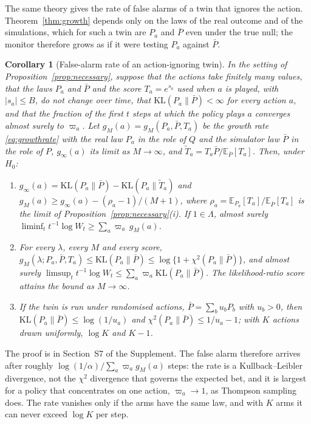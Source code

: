 \documentclass[12pt]{article}
\newcommand{\E}{\mathbb{E}}
\newcommand{\KL}{\mathrm{KL}}
\newtheorem{corollary}{Corollary}
\theoremstyle{remark}
\begin{document}
The same theory gives the rate of false alarms of a twin that ignores the
action. Theorem~\ref{thm:growth} depends only on the laws of the real outcome
and of the simulations, which for such a twin are $P_a$ and $\bar P$ even
under the true null; the monitor therefore grows as if it were testing $P_a$
against $\bar P$.

\begin{corollary}[False-alarm rate of an action-ignoring twin]\label{cor:falsealarm}
In the setting of Proposition~\ref{prop:necessary}, suppose that the actions
take finitely many values, that the laws $P_a$ and $\bar P$ and the score
$T_a = e^{s_a}$ used when $a$ is played, with $|s_a| \le B$, do not change
over time, that $\KL(P_a\|\bar P) < \infty$ for every action $a$, and that the
fraction of the first $t$ steps at which the policy plays $a$ converges almost
surely to $\varpi_a$. Let $g_M(a) = g_M(P_a, \bar P, T_a)$ be the growth rate
\eqref{eq:growthrate} with the real law $P_a$ in the role of $Q$ and the
simulator law $\bar P$ in the role of $P$, $g_\infty(a)$ its limit as
$M \to \infty$, and
$\tilde T_a = T_a\bar P/\E_{\bar P}[T_a]$. Then, under $H_0$:
\begin{enumerate}
\item[(i)] $g_\infty(a) = \KL(P_a\|\bar P) - \KL(P_a\|\tilde T_a)$ and
$g_M(a) \ge g_\infty(a) - (\rho_a - 1)/(M+1)$, where
$\rho_a = \E_{P_a}[T_a]/\E_{\bar P}[T_a]$ is the limit of
Proposition~\ref{prop:necessary}(i). If $1 \in \Lambda$, almost surely
$\liminf_t t^{-1}\log W_t \ge \sum_a \varpi_a\, g_M(a)$.
\item[(ii)] For every $\lambda$, every $M$ and every score,
$g_M(\lambda; P_a, \bar P, T_a) \le \KL(P_a\|\bar P)
\le \log\{1 + \chi^2(P_a\|\bar P)\}$, and almost surely
$\limsup_t t^{-1}\log W_t \le \sum_a \varpi_a \KL(P_a\|\bar P)$. The
likelihood-ratio score attains the bound as $M \to \infty$.
\item[(iii)] If the twin is run under randomised actions,
$\bar P = \sum_b u_b P_b$ with $u_b > 0$, then
$\KL(P_a\|\bar P) \le \log(1/u_a)$ and $\chi^2(P_a\|\bar P) \le 1/u_a - 1$;
with $K$ actions drawn uniformly, $\log K$ and $K - 1$.
\end{enumerate}
\end{corollary}

The proof is in Section~S7 of the Supplement. The false alarm therefore arrives
after roughly $\log(1/\alpha)/\sum_a \varpi_a g_M(a)$ steps: the rate is a
Kullback--Leibler divergence, not the $\chi^2$ divergence that governs the
expected bet, and it is largest for a policy that concentrates on one action,
$\varpi_a \to 1$, as Thompson sampling does. The rate vanishes only if the arms
have the same law, and with $K$ arms it can never exceed $\log K$ per step.
\end{document}
